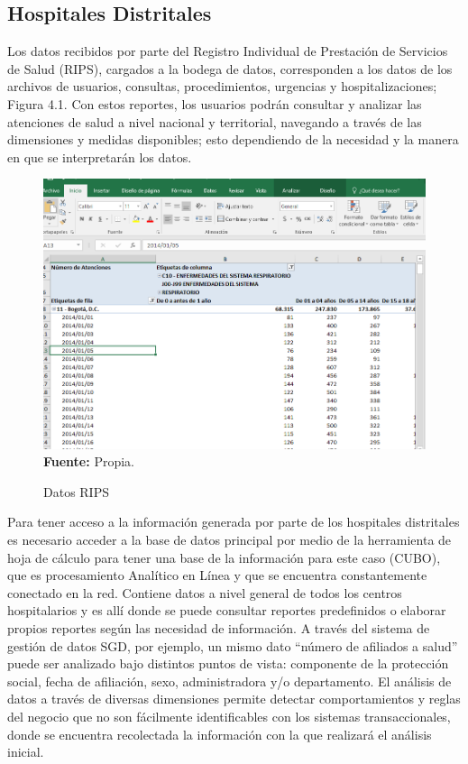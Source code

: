 \documentclass[a4paper,openright,12pt]{book}
\theoremstyle{definition}
\theoremstyle{remark}
\begin{document}
\subsection{Hospitales Distritales}
Los datos recibidos por parte del Registro Individual de Prestación de Servicios de Salud (RIPS), cargados a la bodega de datos, corresponden a los datos de los archivos de usuarios, consultas, procedimientos, urgencias y hospitalizaciones; Figura 4.1. Con estos reportes, los usuarios podrán consultar y analizar las atenciones de salud a nivel nacional y territorial, navegando a través de las dimensiones y medidas disponibles; esto dependiendo de la necesidad y la manera en que se interpretarán los datos.

\begin{figure}[ht]
\centering
\caption{Datos RIPS} 
\includegraphics[scale=0.5]{prepa2}
\label{fig:Rips6}
\\ \textbf{Fuente:} Propia.
\end{figure}

Para tener acceso a la información generada por parte de los hospitales distritales es necesario acceder  a la base de datos principal por medio de la herramienta de  hoja de cálculo para tener una base de la información para este caso (CUBO), que es procesamiento Analítico en Línea y que se encuentra constantemente conectado en la red. Contiene datos a nivel general de todos los centros hospitalarios y es allí donde se puede consultar reportes predefinidos o elaborar propios reportes según las necesidad de información. A través del sistema de gestión de datos SGD, por ejemplo, un mismo dato “número de afiliados a salud” puede ser analizado bajo distintos puntos de vista: componente de la protección social, fecha de afiliación, sexo, administradora y/o departamento. El análisis de datos a través de diversas dimensiones permite detectar comportamientos y reglas del negocio que no son fácilmente identificables con los sistemas transaccionales,
donde se encuentra recolectada la información con la que realizará el análisis inicial.
\end{document}
